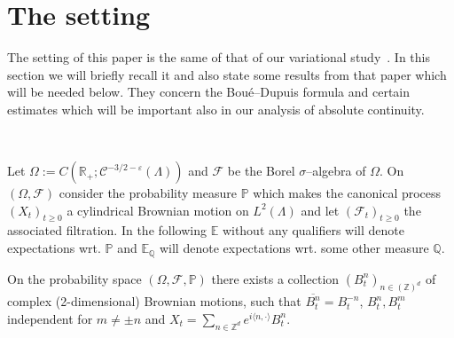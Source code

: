 \documentclass[11pt]{article}
\newcommand{\assign}{:=}
\newcommand{\VV}{\mathscr{C}}
\newcommand{\CF}{\mathscr{F}}
\begin{document}
\section{The setting}

The setting of this paper is the same of that of our variational
study~{\cite{barashkov_gubinelli_variational}}. In this section we will
briefly recall it and also state some results from that paper which will be
needed below. They concern the Bou{\'e}--Dupuis formula and certain estimates
which will be important also in our analysis of absolute continuity.

\

Let $\Omega \assign C \left( \mathbb{R}_+ ; \VV^{- 3 / 2 - \varepsilon}
(\Lambda) \right)$ and $\CF$ be the Borel $\sigma$--algebra of $\Omega$. On
$\left( \Omega, \CF \right)$ consider the probability measure $\mathbb{P}$
which makes the canonical process $(X_t)_{t \geqslant 0}$ a cylindrical
Brownian motion on $L^2 (\Lambda)$ and let $\left( \CF_t \right)_{t \geqslant
0}$ the associated filtration. In the following $\mathbb{E}$ without any
qualifiers will denote expectations wrt. $\mathbb{P}$ and
$\mathbb{E}_{\mathbb{Q}}$ will denote expectations wrt. some other measure
$\mathbb{Q}$.

On the probability space $\left( \Omega, \CF, \mathbb{P} \right)$ there
exists a collection $(B_t^n)_{n \in (\mathbb{Z})^d}$ of complex
(2-dimensional) Brownian motions, such that $\overline{B^n_t} = B^{- n}_t$,
$B^n_t, B^m_t$ independent for $m \neq \pm n$ and $X_t = \sum_{n \in
\mathbb{Z}^d} e^{i \langle n, \cdot \rangle} B^n_t$.

\
\end{document}

